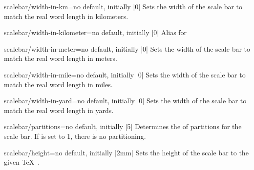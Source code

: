 \begin{docMrcKey}{scalebar/width-in-km}{=}{no default, initially |0|}
  Sets the width of the scale bar to match the real word length 
  in kilometers.
\end{docMrcKey}

\begin{docMrcKey}{scalebar/width-in-kilometer}{=}{no default, initially |0|}
  Alias for 
\end{docMrcKey}

\begin{docMrcKey}{scalebar/width-in-meter}{=}{no default, initially |0|}
  Sets the width of the scale bar to match the real word length 
  in meters.
\end{docMrcKey}

\begin{docMrcKey}{scalebar/width-in-mile}{=}{no default, initially |0|}
  Sets the width of the scale bar to match the real word length 
  in miles.
\end{docMrcKey}

\begin{docMrcKey}{scalebar/width-in-yard}{=}{no default, initially |0|}
  Sets the width of the scale bar to match the real word length 
  in yards.
\end{docMrcKey}

\begin{docMrcKey}{scalebar/partitions}{=}{no default, initially |5|}
  Determines the  of partitions for the scale bar. If 
  is set to 1, there is no partitioning.
\end{docMrcKey}

\begin{docMrcKey}{scalebar/height}{=}{no default, initially |2mm|}
  Sets the height of the scale bar to the given \TeX\ .
\end{docMrcKey}


